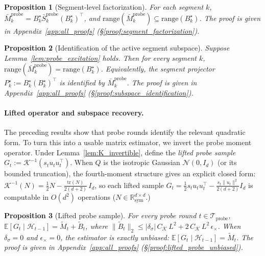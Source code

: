 \documentclass{article}
\newcommand{\R}{\mathbb{R}}
\newcommand{\E}{\mathbb{E}}
\newcommand{\cH}{\mathcal{H}}
\newcommand{\cTprobe}{\mathcal{T}_{\mathrm{probe}}}
\newcommand{\range}{\mathrm{range}}
\newcommand{\tr}{\mathrm{tr}}
\newtheorem{proposition}{Proposition}
\begin{document}
\begin{proposition}[Segment-level factorization]
\label{prop:segment_factorization}
For each segment $k$, $\bar M_k^{\mathrm{probe}} = B_k^\star \bar S_k^{\mathrm{probe}} (B_k^\star)^\top$, and $\range(\bar M_k^{\mathrm{probe}})\subseteq \range(B_k^\star)$.
The proof is given in Appendix~\ref{app:all_proofs} (\S\ref{proof:segment_factorization}).
\end{proposition}



\begin{proposition}[Identification of the active segment subspace]
\label{prop:subspace_identification}
Suppose Lemma~\ref{lem:probe_excitation} holds.
Then for every segment $k$,
$\range(\bar M_k^{\mathrm{probe}}) = \range(B_k^\star)$.
Equivalently, the segment projector $P_k^\star := B_k^\star (B_k^\star)^\top$ is identified by $\bar M_k^{\mathrm{probe}}$.
The proof is given in Appendix~\ref{app:all_proofs} (\S\ref{proof:subspace_identification}).
\end{proposition}



\paragraph{Lifted operator and subspace recovery.} The preceding results show that probe rounds identify the relevant quadratic form. To turn this into a usable matrix estimator, we invert the probe moment operator. Under Lemma~\ref{lem:K_invertible}, define the \emph{lifted probe sample} $G_t := \mathcal K^{-1}(s_t u_tu_t^\top).$ When $Q$ is the isotropic Gaussian $\mathcal{N}(0, I_d)$ (or its bounded truncation), the fourth-moment structure gives an explicit closed form: $\mathcal K^{-1}(N) = \tfrac{1}{2}N - \tfrac{\tr(N)}{2(d+2)}\,I_d$, so each lifted sample $G_t = \frac{1}{2}s_t u_t u_t^\top - \frac{s_t \|u_t\|^2}{2(d+2)}I_d$ is computable in $O(d^2)$ operations ($N \in \R_{\mathrm{sym}}^{d\times d}.$)

\begin{proposition}[Lifted probe sample]
\label{prop:lifted_probe_unbiased}
For every probe round $t\in\cTprobe$,
$\E[G_t \mid \cH_{t-1}] = \widetilde M_t + \widetilde B_t$,
where $\|\widetilde B_t\|_2 \le |\delta_\sigma|\,C_{\mathcal K}\,L^2 + 2\,C_{\mathcal K}\,L^2\,\epsilon_\times$.
When $\delta_\sigma = 0$ and $\epsilon_\times = 0$, the estimator is exactly unbiased: $\E[G_t \mid \cH_{t-1}] = \widetilde M_t$.
The proof is given in Appendix~\ref{app:all_proofs} (\S\ref{proof:lifted_probe_unbiased}).
\end{proposition}
\end{document}
